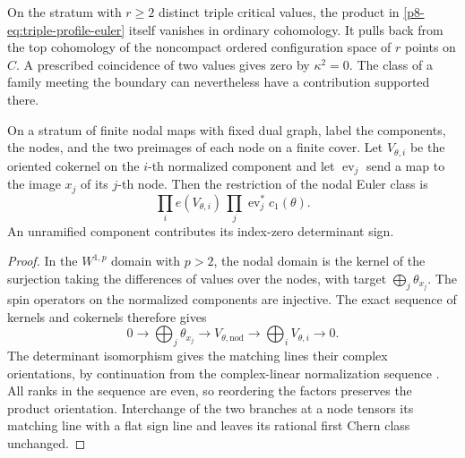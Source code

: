 On the stratum with \(r\ge2\) distinct triple critical values,
the product in \eqref{p8-eq:triple-profile-euler} itself vanishes in
ordinary cohomology. It pulls back from the top cohomology of the
noncompact ordered configuration space of \(r\) points on \(C\).
A prescribed coincidence of two values gives zero by \(\kappa^2=0\).
The class of a family meeting the boundary can nevertheless have a
contribution supported there.

\begin{corollary}\label{p8-cor:nodal-spin-matching}
On a stratum of finite nodal maps with fixed dual graph, label the
components, the nodes, and the two preimages of each node on a finite
cover. Let \(V_{\theta,i}\) be the oriented cokernel on the \(i\)-th
normalized component and let \(\operatorname{ev}_j\) send a map to
the image \(x_j\) of its \(j\)-th node.
Then the restriction of the nodal Euler class is
\[
             \prod_i e(V_{\theta,i})\,
             \prod_j\operatorname{ev}_j^*c_1(\theta).
\]
An unramified component contributes its index-zero determinant sign.
\end{corollary}

\begin{proof}
In the \(W^{1,p}\) domain with \(p>2\), the nodal domain is the
kernel of the surjection taking the differences of values over the
nodes, with target \(\bigoplus_j\theta_{x_j}\). The spin operators
on the normalized components are injective. The exact sequence of
kernels and cokernels therefore gives
\[
 0\longrightarrow\bigoplus_j\theta_{x_j}\longrightarrow
 V_{\theta,\mathrm{nod}}\longrightarrow\bigoplus_iV_{\theta,i}
 \longrightarrow0.
\]
The determinant isomorphism gives the matching lines their complex
orientations, by continuation from the complex-linear normalization
sequence \cite{zinger}. All ranks in the sequence are even, so
reordering the factors preserves the product orientation. Interchange
of the two branches at a node tensors its matching line with a flat
sign line and leaves its rational first Chern class unchanged.
\end{proof}
